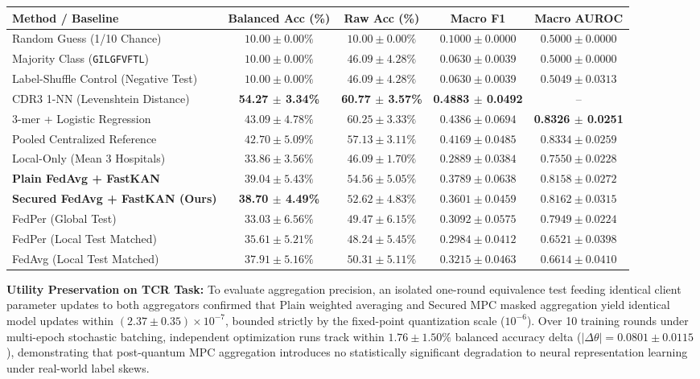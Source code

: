 \documentclass[11pt,a4paper]{article}
\begin{document}
\begin{center}
\begin{longtable}{@{}p{5.4cm}cccc@{}}
\toprule
\textbf{Method / Baseline} & \textbf{Balanced Acc (\%)} & \textbf{Raw Acc (\%)} & \textbf{Macro F1} & \textbf{Macro AUROC} \\
\midrule
\endhead
Random Guess (1/10 Chance)             & $10.00 \pm 0.00\%$ & $10.00 \pm 0.00\%$ & $0.1000 \pm 0.0000$ & $0.5000 \pm 0.0000$ \\
Majority Class (\lstinline|GILGFVFTL|) & $10.00 \pm 0.00\%$ & $46.09 \pm 4.28\%$ & $0.0630 \pm 0.0039$ & $0.5000 \pm 0.0000$ \\
Label-Shuffle Control (Negative Test)  & $10.00 \pm 0.00\%$ & $46.09 \pm 4.28\%$ & $0.0630 \pm 0.0039$ & $0.5049 \pm 0.0313$ \\
CDR3 1-NN (Levenshtein Distance)       & \textbf{54.27 $\pm$ 3.34\%} & \textbf{60.77 $\pm$ 3.57\%} & \textbf{0.4883 $\pm$ 0.0492} & -- \\
3-mer + Logistic Regression            & $43.09 \pm 4.78\%$ & $60.25 \pm 3.33\%$ & $0.4386 \pm 0.0694$ & \textbf{0.8326 $\pm$ 0.0251} \\
\midrule
Pooled Centralized Reference           & $42.70 \pm 5.09\%$ & $57.13 \pm 3.11\%$ & $0.4169 \pm 0.0485$ & $0.8334 \pm 0.0259$ \\
Local-Only (Mean 3 Hospitals)          & $33.86 \pm 3.56\%$ & $46.09 \pm 1.70\%$ & $0.2889 \pm 0.0384$ & $0.7550 \pm 0.0228$ \\
\midrule
\textbf{Plain FedAvg + FastKAN}        & $39.04 \pm 5.43\%$ & $54.56 \pm 5.05\%$ & $0.3789 \pm 0.0638$ & $0.8158 \pm 0.0272$ \\
\textbf{Secured FedAvg + FastKAN (Ours)} & \textbf{38.70 $\pm$ 4.49\%} & $52.62 \pm 4.83\%$ & $0.3601 \pm 0.0459$ & $0.8162 \pm 0.0315$ \\
\midrule
FedPer (Global Test)                   & $33.03 \pm 6.56\%$ & $49.47 \pm 6.15\%$ & $0.3092 \pm 0.0575$ & $0.7949 \pm 0.0224$ \\
FedPer (Local Test Matched)            & $35.61 \pm 5.21\%$ & $48.24 \pm 5.45\%$ & $0.2984 \pm 0.0412$ & $0.6521 \pm 0.0398$ \\
FedAvg (Local Test Matched)            & $37.91 \pm 5.16\%$ & $50.31 \pm 5.11\%$ & $0.3215 \pm 0.0463$ & $0.6614 \pm 0.0410$ \\
\bottomrule
\end{longtable}
\end{center}

\noindent\textbf{Utility Preservation on TCR Task:} To evaluate aggregation precision, an isolated one-round equivalence test feeding identical client parameter updates to both aggregators confirmed that Plain weighted averaging and Secured MPC masked aggregation yield identical model updates within $(2.37 \pm 0.35) \times 10^{-7}$, bounded strictly by the fixed-point quantization scale ($10^{-6}$). Over 10 training rounds under multi-epoch stochastic batching, independent optimization runs track within $1.76 \pm 1.50\%$ balanced accuracy delta ($|\Delta \theta| = 0.0801 \pm 0.0115$), demonstrating that post-quantum MPC aggregation introduces no statistically significant degradation to neural representation learning under real-world label skews.
\end{document}
